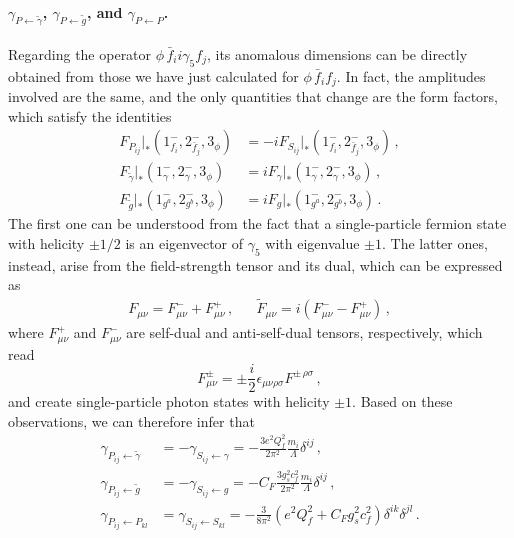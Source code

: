\paragraph{\texorpdfstring{$\gamma_{P\leftarrow \tilde \gamma}$, $\gamma_{P \leftarrow \tilde g}$, and $\gamma_{P\leftarrow P}$}{gamma P from gammatilde, gtilde, and P}.}
\label{par:ALPPhiff}
Regarding the operator $\phi\, \bar f_i i \gamma_5 f_j$, its anomalous dimensions can be
directly obtained from those we have just calculated for $\phi\, \bar f_i  f_j$.
In fact, the amplitudes involved are the same, and the only quantities that change are the form
factors, which satisfy the identities
\begin{align}
    F_{P_{ij}}|_*(1_{f_i}^-,2_{\bar f_j}^-,3_\phi) &= -i F_{S_{ij}}|_*(1_{f_i}^-,2_{\bar f_j}^-,3_\phi)\,,\\
    F_{\tilde\gamma}|_* (1^-_\gamma,2^-_\gamma,3_\phi)&=iF_\gamma|_* (1^-_\gamma,2^-_\gamma,3_\phi)\,,\\
    F_{\tilde g}|_* (1^-_{g^a},2^-_{g^b},3_\phi)&=iF_g|_* (1^-_{g^a},2^-_{g^b},3_\phi)\,.
\end{align}
The first one can be understood from the fact that a single-particle fermion state with
helicity $\pm 1/2$ is an eigenvector of $\gamma_5$ with eigenvalue $\pm 1$.
The latter ones, instead, arise from the field-strength tensor and its dual, which can be
expressed as
\begin{align}
\label{eq:ALPObs1}
    F_{\mu\nu}=F^-_{\mu\nu}+F^+_{\mu\nu} \,, &&
    \widetilde F_{\mu\nu}=i\left(F^-_{\mu\nu}-F^+_{\mu\nu}\right)\,,
\end{align}
where $F^{+}_{\mu\nu}$ and $F^{-}_{\mu\nu}$ are self-dual and anti-self-dual tensors,
respectively, which read
\begin{equation}
    F^{\pm}_{\mu\nu} = \pm \frac{i}{2}\epsilon_{\mu\nu\rho\sigma}F^{\pm \, \rho\sigma}\,,
\end{equation}
and create single-particle photon states with helicity $\pm 1$.
Based on these observations, we can therefore infer that
\begin{align}
    \gamma_{P_{ij}\leftarrow \tilde\gamma} &= - \gamma_{S_{ij}\leftarrow \gamma} = - \frac{3e^2Q_f^2}{2\pi^2}\frac{m_i}{\Lambda}\delta^{ij} \,,\\
    \gamma_{P_{ij}\leftarrow \tilde g} &= - \gamma_{S_{ij}\leftarrow g} = - C_F\frac{3g_s^2c_f^2}{2\pi^2}\frac{m_i}{\Lambda}\delta^{ij} \,,\\
    \gamma_{P_{ij}\leftarrow P_{kl}} &= \gamma_{S_{ij}\leftarrow S_{kl}} = -\frac{3}{8\pi^2}(e^2Q_f^2+C_Fg_s^2c_f^2)\delta^{ik}\delta^{jl} \,.
\end{align}

